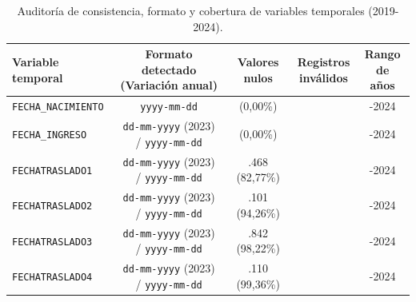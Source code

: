 \begin{table}[htbp]
\centering
\scriptsize
\setlength{\tabcolsep}{3pt}
\renewcommand{\arraystretch}{1.1}
\caption{Auditoría de consistencia, formato y cobertura de variables temporales (2019-2024).}
\label{tab:auditoria_fechas_grd}
\begin{tabular}{|l|c|c|c|c|}
\hline
\parbox[t]{2.8cm}{\textbf{Variable temporal}} & 
\parbox[t]{3.6cm}{\centering\textbf{Formato detectado\\(Variación anual)}} & 
\parbox[t]{2.2cm}{\centering\textbf{Valores nulos}} & 
\parbox[t]{1.3cm}{\centering\textbf{Registros\\inválidos}} & 
\parbox[t]{1.8cm}{\centering\textbf{Rango de\\años}} \\ \hline

\parbox[t]{2.8cm}{\texttt{FECHA\_NACIMIENTO}} & \parbox[t]{3.6cm}{\centering \texttt{yyyy-mm-dd}} & \parbox[t]{2.2cm}{ (0,00\%)} & \parbox[t]{1.3cm}{} & \parbox[t]{1.8cm}{-2024} \\ \hline
\parbox[t]{2.8cm}{\texttt{FECHA\_INGRESO}} & \parbox[t]{3.6cm}{\centering \texttt{dd-mm-yyyy} (2023) / \texttt{yyyy-mm-dd}} & \parbox[t]{2.2cm}{ (0,00\%)} & \parbox[t]{1.3cm}{} & \parbox[t]{1.8cm}{-2024} \\ \hline
\parbox[t]{2.8cm}{\texttt{FECHATRASLADO1}} & \parbox[t]{3.6cm}{\centering \texttt{dd-mm-yyyy} (2023) / \texttt{yyyy-mm-dd}} & \parbox[t]{2.2cm}{.468 (82,77\%)} & \parbox[t]{1.3cm}{} & \parbox[t]{1.8cm}{-2024} \\ \hline
\parbox[t]{2.8cm}{\texttt{FECHATRASLADO2}} & \parbox[t]{3.6cm}{\centering \texttt{dd-mm-yyyy} (2023) / \texttt{yyyy-mm-dd}} & \parbox[t]{2.2cm}{.101 (94,26\%)} & \parbox[t]{1.3cm}{} & \parbox[t]{1.8cm}{-2024} \\ \hline
\parbox[t]{2.8cm}{\texttt{FECHATRASLADO3}} & \parbox[t]{3.6cm}{\centering \texttt{dd-mm-yyyy} (2023) / \texttt{yyyy-mm-dd}} & \parbox[t]{2.2cm}{.842 (98,22\%)} & \parbox[t]{1.3cm}{} & \parbox[t]{1.8cm}{-2024} \\ \hline
\parbox[t]{2.8cm}{\texttt{FECHATRASLADO4}} & \parbox[t]{3.6cm}{\centering \texttt{dd-mm-yyyy} (2023) / \texttt{yyyy-mm-dd}} & \parbox[t]{2.2cm}{.110 (99,36\%)} & \parbox[t]{1.3cm}{} & \parbox[t]{1.8cm}{-2024} \\ \hline

\end{tabular}
\end{table}
